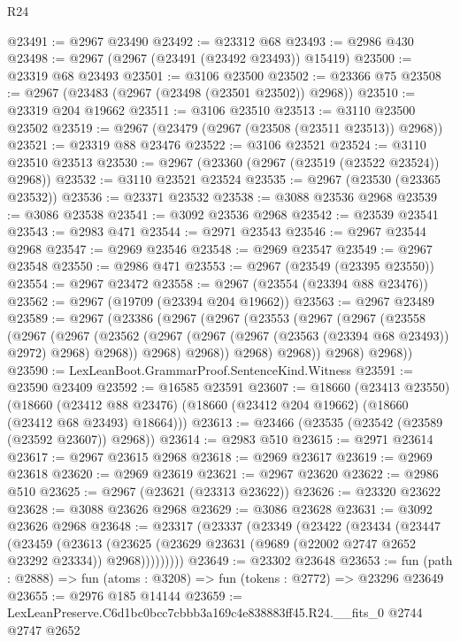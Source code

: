 \begin{lexlean}{R24}
\begin{coremodule}
@23491 := @2967 @23490
@23492 := @23312 @68
@23493 := @2986 @430
@23498 := @2967 (@2967 (@23491 (@23492 @23493)) @15419)
@23500 := @23319 @68 @23493
@23501 := @3106 @23500
@23502 := @23366 @75
@23508 := @2967 (@23483 (@2967 (@23498 (@23501 @23502)) @2968))
@23510 := @23319 @204 @19662
@23511 := @3106 @23510
@23513 := @3110 @23500 @23502
@23519 := @2967 (@23479 (@2967 (@23508 (@23511 @23513)) @2968))
@23521 := @23319 @88 @23476
@23522 := @3106 @23521
@23524 := @3110 @23510 @23513
@23530 := @2967 (@23360 (@2967 (@23519 (@23522 @23524)) @2968))
@23532 := @3110 @23521 @23524
@23535 := @2967 (@23530 (@23365 @23532))
@23536 := @23371 @23532
@23538 := @3088 @23536 @2968
@23539 := @3086 @23538
@23541 := @3092 @23536 @2968
@23542 := @23539 @23541
@23543 := @2983 @471
@23544 := @2971 @23543
@23546 := @2967 @23544 @2968
@23547 := @2969 @23546
@23548 := @2969 @23547
@23549 := @2967 @23548
@23550 := @2986 @471
@23553 := @2967 (@23549 (@23395 @23550))
@23554 := @2967 @23472
@23558 := @2967 (@23554 (@23394 @88 @23476))
@23562 := @2967 (@19709 (@23394 @204 @19662))
@23563 := @2967 @23489
@23589 := @2967
    (@23386
      (@2967
        (@2967
          (@23553
            (@2967
              (@2967
                (@23558
                  (@2967
                    (@2967
                      (@23562
                        (@2967 (@2967 (@2967 (@23563 (@23394 @68 @23493)) @2972) @2968) @2968))
                      @2968)
                    @2968))
                @2968)
              @2968))
          @2968)
        @2968))
@23590 := LexLeanBoot.GrammarProof.SentenceKind.Witness
@23591 := @23590 @23409
@23592 := @16585 @23591
@23607 := @18660
    (@23413 @23550)
    (@18660 (@23412 @88 @23476) (@18660 (@23412 @204 @19662) (@18660 (@23412 @68 @23493) @18664)))
@23613 := @23466 (@23535 (@23542 (@23589 (@23592 @23607)) @2968))
@23614 := @2983 @510
@23615 := @2971 @23614
@23617 := @2967 @23615 @2968
@23618 := @2969 @23617
@23619 := @2969 @23618
@23620 := @2969 @23619
@23621 := @2967 @23620
@23622 := @2986 @510
@23625 := @2967 (@23621 (@23313 @23622))
@23626 := @23320 @23622
@23628 := @3088 @23626 @2968
@23629 := @3086 @23628
@23631 := @3092 @23626 @2968
@23648 := @23317
    (@23337
      (@23349
        (@23422
          (@23434
            (@23447
              (@23459
                (@23613
                  (@23625 (@23629 @23631 (@9689 (@22002 @2747 @2652 @23292 @23334)) @2968)))))))))
@23649 := @23302 @23648
@23653 := fun (path : @2888) => fun (atoms : @3208) => fun (tokens : @2772) => @23296 @23649
@23655 := @2976 @185 @14144
@23659 := LexLeanPreserve.C6d1bc0bcc7cbbb3a169c4e838883ff45.R24.__fits_0 @2744 @2747 @2652

\end{coremodule}
\end{lexlean}
